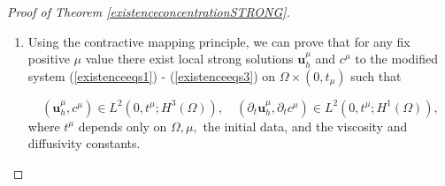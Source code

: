 \documentclass[11pt]{article}
\newcommand*\diff{\mathop{}\!\mathrm{d}}
\begin{document}
\begin{proof}[Proof of Theorem \ref{existenceconcentrationSTRONG}]
\begin{enumerate}
On the other hand, we define a modified version of the convection-diffusion equation (\ref{HNSC5_strong_cshift}) by completing the missing term in the Laplacian adding the term $\mu \partial_{11} c$ with $\mu > 0$; specifically, the set of equations takes the form
%
\begin{equation} \label{existenceeqs1}
\begin{split}
\partial_t \mathbf{u}_h + \Delta_\nu \mathbf{u}_h + & (\mathbf{u}_h \cdot \nabla_h) \mathbf{u}_h - \bigg ( \int_{-a}^z \nabla_h \cdot \mathbf{u}_h (x, y, \xi, t) \diff \xi \bigg ) \partial_3 \mathbf{u}_h \\
& + f_0 k \times \mathbf{u}_h + \nabla_h p_s (x,y,t) = 0,
\end{split}
\end{equation}
%
\begin{equation} \label{existenceeqs2}
\nabla_h \cdot \bar{\mathbf{u}}_h = 0,
\end{equation}
%
\begin{equation} \label{existenceeqs3}
\begin{split}
\partial_t c+ \mathbf{u}_h \cdot \nabla_h c + \bigg ( - & \int_{-a}^z \nabla_h \cdot \mathbf{u}_h (x, y, \xi, t) \diff \xi \bigg ) \cdot \bigg (\partial_3 c - \frac{1}{a} \bigg ) \\
& - \Delta_{d} c - \mu \partial_{11} c = 0.
\end{split}
\end{equation}

Here $\bar{\mathbf{u}}_h$ is the vertically averaged version of the function, i.e. $$\frac{1}{2a} \int_{-a}^a \mathbf{u}_h (x,y,z) \diff z,$$ and $p_s$ is the classical notation for a pressure function depending on only the horizontal variables. Fore more details of this standard reformulation process see for example \cite{cao2014local} and \cite{cao2007global}.

\item Using the contractive mapping principle, we can prove that for any fix positive $\mu$ value there exist local strong solutions $\mathbf{u}_h^\mu$ and $c^\mu$ to the modified system (\ref{existenceeqs1}) - (\ref{existenceeqs3}) on $\Omega \times (0, t_\mu)$ such that

\[ (\mathbf{u}_h^\mu, c^\mu) \in L^2 (0, t^\mu; H^3(\Omega)), \quad (\partial_t \mathbf{u}_h^\mu, \partial_t c^\mu) \in L^2 (0, t^\mu; H^1 (\Omega)), \]
%
where $t^\mu$ depends only on $\Omega, \mu, $ the initial data, and the viscosity and diffusivity constants.


\end{enumerate}
\end{proof}
\end{document}
